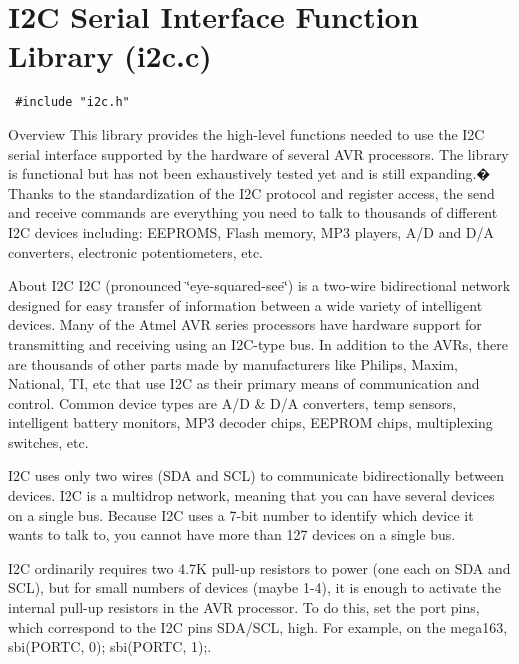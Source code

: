 \hypertarget{group__i2c}{
\section{I2C Serial Interface Function Library (i2c.c)}
\label{group__i2c}
}


\begin{Code}\begin{verbatim} #include "i2c.h" 
\end{verbatim}
\end{Code}

 \begin{Desc}
\item[Overview]This library provides the high-level functions needed to use the I2C serial interface supported by the hardware of several AVR processors. The library is functional but has not been exhaustively tested yet and is still expanding.� Thanks to the standardization of the I2C protocol and register access, the send and receive commands are everything you need to talk to thousands of different I2C devices including: EEPROMS, Flash memory, MP3 players, A/D and D/A converters, electronic potentiometers, etc.\end{Desc}
\begin{Desc}
\item[About I2C]I2C (pronounced \char`\"{}eye-squared-see\char`\"{}) is a two-wire bidirectional network designed for easy transfer of information between a wide variety of intelligent devices. Many of the Atmel AVR series processors have hardware support for transmitting and receiving using an I2C-type bus. In addition to the AVRs, there are thousands of other parts made by manufacturers like Philips, Maxim, National, TI, etc that use I2C as their primary means of communication and control. Common device types are A/D \& D/A converters, temp sensors, intelligent battery monitors, MP3 decoder chips, EEPROM chips, multiplexing switches, etc.\end{Desc}
I2C uses only two wires (SDA and SCL) to communicate bidirectionally between devices. I2C is a multidrop network, meaning that you can have several devices on a single bus. Because I2C uses a 7-bit number to identify which device it wants to talk to, you cannot have more than 127 devices on a single bus.

I2C ordinarily requires two 4.7K pull-up resistors to power (one each on SDA and SCL), but for small numbers of devices (maybe 1-4), it is enough to activate the internal pull-up resistors in the AVR processor. To do this, set the port pins, which correspond to the I2C pins SDA/SCL, high. For example, on the mega163, sbi(PORTC, 0); sbi(PORTC, 1);.

